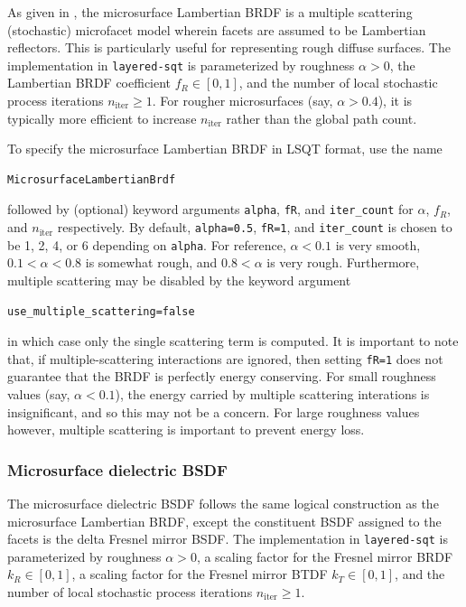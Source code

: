 \documentclass[
    twoside,
    twocolumn,
    letterpaper,
    10pt]{article}
\begin{document}
As given in \cite{Heitz:16},
the microsurface Lambertian BRDF is a multiple scattering (stochastic)
microfacet model wherein facets are assumed to be Lambertian reflectors. 
This is particularly useful for representing rough diffuse surfaces. The 
implementation in \texttt{layered-sqt} is parameterized by
roughness $\alpha>0$, the Lambertian BRDF coefficient 
$f_R \in [0,1]$, and the number of local stochastic process 
iterations $n_{\text{iter}} \ge 1$. For rougher microsurfaces 
(say, $\alpha > 0.4$), it is typically more efficient to increase 
$n_{\text{iter}}$ rather than the global path count.

To specify the microsurface Lambertian BRDF 
in LSQT format, use the name 
\begin{lstlisting}
MicrosurfaceLambertianBrdf
\end{lstlisting}
followed by (optional) keyword arguments 
\texttt{alpha}, \texttt{fR}, and \texttt{iter\_count} for $\alpha$,
$f_R$, and $n_{\text{iter}}$ respectively. By default, \texttt{alpha=0.5},
\texttt{fR=1}, and \texttt{iter\_count} is chosen to be 1, 2, 4, or 6 
depending on \texttt{alpha}. For reference, $\alpha < 0.1$ is very smooth, 
$0.1 < \alpha < 0.8$ is somewhat rough, and $0.8 < \alpha$ is very rough.
Furthermore, multiple scattering may be disabled by the keyword argument
\begin{lstlisting}
use_multiple_scattering=false
\end{lstlisting}
in which case only the single scattering term is computed. It is 
important to note that, if multiple-scattering interactions are 
ignored, then setting \texttt{fR=1} does not guarantee that the BRDF 
is perfectly energy conserving. 
For small roughness values (say, $\alpha < 0.1$), the energy carried by 
multiple scattering interations is insignificant, and so this may not be a
concern. For large roughness values however, multiple scattering is important
to prevent energy loss.

\subsubsection{Microsurface dielectric BSDF}
\label{sec:doc-layers-microsurface-dielectric}

The microsurface dielectric BSDF follows the same logical construction as 
the microsurface Lambertian BRDF, except the constituent BSDF assigned to the
facets is the delta Fresnel mirror BSDF. The implementation in 
\texttt{layered-sqt} is parameterized by roughness $\alpha > 0$, a scaling
factor for the Fresnel mirror BRDF $k_R \in [0, 1]$, a scaling factor for 
the Fresnel mirror BTDF $k_T \in [0, 1]$, and the number of local stochastic 
process iterations $n_{\text{iter}} \ge 1$.
\end{document}

